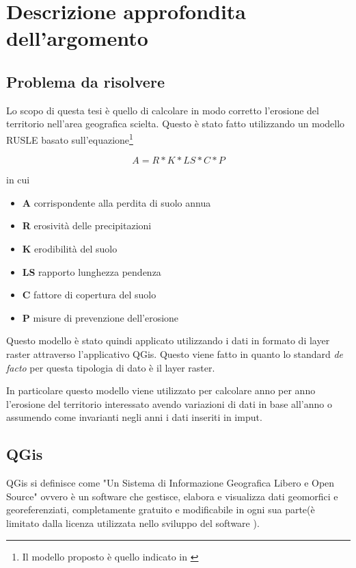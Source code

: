 
\chapter{Descrizione approfondita dell'argomento}
\label{cap:descrizione}
\section{Problema da risolvere} Lo scopo di questa tesi è quello di calcolare in
modo corretto l'erosione del territorio nell'area geografica scielta.
Questo è stato fatto utilizzando un modello RUSLE basato sull'equazione\footnote{Il
modello proposto è quello indicato in \cite[p.~37]{tesi:ambientale}}

\begin{equation}
A = R * K * LS * C * P
\end{equation}

in cui
\begin{itemize}
\item \textbf{A} corrispondente alla perdita di suolo annua
\item \textbf{R} erosività delle precipitazioni
\item \textbf{K} erodibilità del suolo
\item \textbf{LS} rapporto lunghezza pendenza
\item \textbf{C} fattore di copertura del suolo
\item \textbf{P} misure di prevenzione dell'erosione
\end{itemize}

Questo modello è stato quindi applicato utilizzando i dati in formato di layer raster attraverso l'applicativo QGis.
Questo viene fatto in quanto lo standard \textit{de facto} per questa tipologia di dato è il layer raster.


In particolare questo modello viene utilizzato per calcolare anno per anno l'erosione del territorio interessato avendo variazioni di dati in base all'anno o assumendo come invarianti negli anni i dati inseriti in imput.

\section{QGis}

QGis si definisce come "Un Sistema di Informazione Geografica Libero e Open Source"\cite{site:qgis} ovvero è un software che gestisce, elabora e visualizza dati geomorfici e georeferenziati, completamente gratuito e modificabile in ogni sua parte(è limitato dalla licenza utilizzata nello sviluppo del software \cite{site:cc3}).

